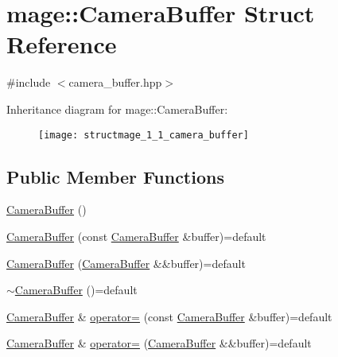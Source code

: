 \hypertarget{structmage_1_1_camera_buffer}{}\section{mage\+:\+:Camera\+Buffer Struct Reference}
\label{structmage_1_1_camera_buffer}


{\ttfamily \#include $<$camera\+\_\+buffer.\+hpp$>$}

Inheritance diagram for mage\+:\+:Camera\+Buffer\+:\begin{figure}[H]
\begin{center}
\leavevmode
\texttt{[image: structmage\_1\_1\_camera\_buffer]}
\end{center}
\end{figure}
\subsection*{Public Member Functions}
\begin{DoxyCompactItemize}
\item 
\hyperlink{structmage_1_1_camera_buffer_aca0a689a43c84fdc02e72d792b1a0ab3}{Camera\+Buffer} ()
\item 
\hyperlink{structmage_1_1_camera_buffer_a4677e0eeb321f52a6f0160c7265186a3}{Camera\+Buffer} (const \hyperlink{structmage_1_1_camera_buffer}{Camera\+Buffer} \&buffer)=default
\item 
\hyperlink{structmage_1_1_camera_buffer_a9ed685bdafbdc4b87546c082588f07c3}{Camera\+Buffer} (\hyperlink{structmage_1_1_camera_buffer}{Camera\+Buffer} \&\&buffer)=default
\item 
\hyperlink{structmage_1_1_camera_buffer_a893ff21cfa017537ccd91dd816715701}{$\sim$\+Camera\+Buffer} ()=default
\item 
\hyperlink{structmage_1_1_camera_buffer}{Camera\+Buffer} \& \hyperlink{structmage_1_1_camera_buffer_a4c2f048e1c441ae147455722d9cd4af7}{operator=} (const \hyperlink{structmage_1_1_camera_buffer}{Camera\+Buffer} \&buffer)=default
\item 
\hyperlink{structmage_1_1_camera_buffer}{Camera\+Buffer} \& \hyperlink{structmage_1_1_camera_buffer_a901081932ab76c9bdfacb0814e821190}{operator=} (\hyperlink{structmage_1_1_camera_buffer}{Camera\+Buffer} \&\&buffer)=default
\end{DoxyCompactItemize}
